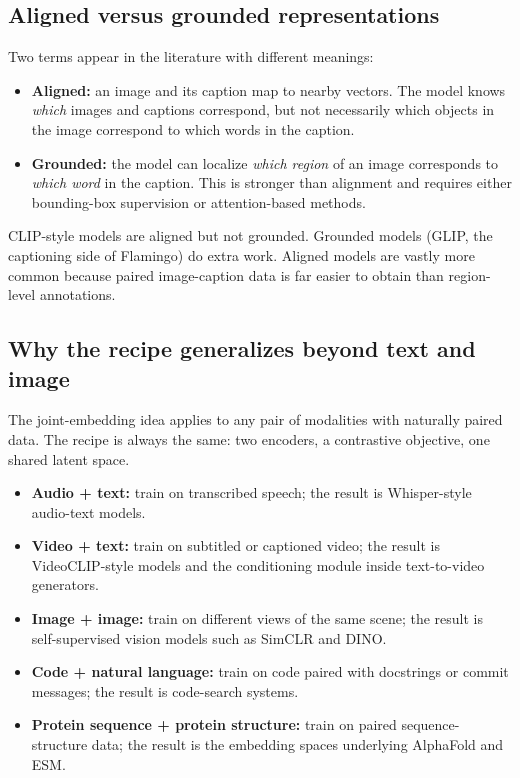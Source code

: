 \documentclass[11pt]{article}
\theoremstyle{remark}
\begin{document}
\subsection{Aligned versus grounded representations}
Two terms appear in the literature with different meanings:
\begin{itemize}[leftmargin=1.4em]
  \item \textbf{Aligned:} an image and its caption map to nearby vectors. The model knows \emph{which} images and captions correspond, but not necessarily which objects in the image correspond to which words in the caption.
  \item \textbf{Grounded:} the model can localize \emph{which region} of an image corresponds to \emph{which word} in the caption. This is stronger than alignment and requires either bounding-box supervision or attention-based methods.
\end{itemize}
CLIP-style models are aligned but not grounded. Grounded models (GLIP, the captioning side of Flamingo) do extra work. Aligned models are vastly more common because paired image-caption data is far easier to obtain than region-level annotations.

\subsection{Why the recipe generalizes beyond text and image}
The joint-embedding idea applies to any pair of modalities with naturally paired data. The recipe is always the same: two encoders, a contrastive objective, one shared latent space.
\begin{itemize}[leftmargin=1.4em]
  \item \textbf{Audio + text:} train on transcribed speech; the result is Whisper-style audio-text models.
  \item \textbf{Video + text:} train on subtitled or captioned video; the result is VideoCLIP-style models and the conditioning module inside text-to-video generators.
  \item \textbf{Image + image:} train on different views of the same scene; the result is self-supervised vision models such as SimCLR and DINO.
  \item \textbf{Code + natural language:} train on code paired with docstrings or commit messages; the result is code-search systems.
  \item \textbf{Protein sequence + protein structure:} train on paired sequence-structure data; the result is the embedding spaces underlying AlphaFold and ESM.
\end{itemize}
\end{document}
